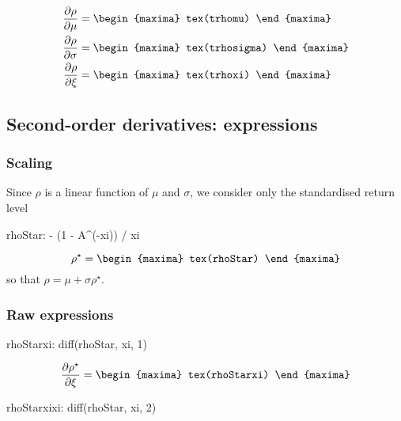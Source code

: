 {\color{MonVertF}
\begin{align*}
  \frac{\partial \rho}{\partial \mu}
  &=
  \begin{maxima}
    tex(trhomu)
  \end{maxima} \\
  \frac{\partial \rho}{\partial \sigma}
  &=
  \begin{maxima}
    tex(trhosigma)
  \end{maxima} \\
  \frac{\partial \rho}{\partial \xi}
  &=
  \begin{maxima}
    tex(trhoxi)
  \end{maxima}
\end{align*}
}

\subsection{Second-order derivatives: expressions}

\subsubsection*{Scaling}
Since $\rho$ is a linear function of $\mu$ and $\sigma$, we
consider only the standardised return level
\begin{maxima}
  rhoStar: - (1 - A^(-xi)) / xi
\end{maxima}
\[
\rho^\star=
\begin{maxima}
  tex(rhoStar)
\end{maxima}
\]
so that $\rho = \mu + \sigma \rho^\star$.

\subsubsection*{Raw expressions}
\begin{maxima}
  rhoStarxi:  diff(rhoStar, xi, 1)
\end{maxima}

{\color{MonVertF}
\[
\frac{\partial \rho^\star}{\partial \xi} = 
\begin{maxima}
  tex(rhoStarxi)
\end{maxima}
\]}


\begin{maxima}
  rhoStarxixi:  diff(rhoStar, xi, 2)
\end{maxima}

